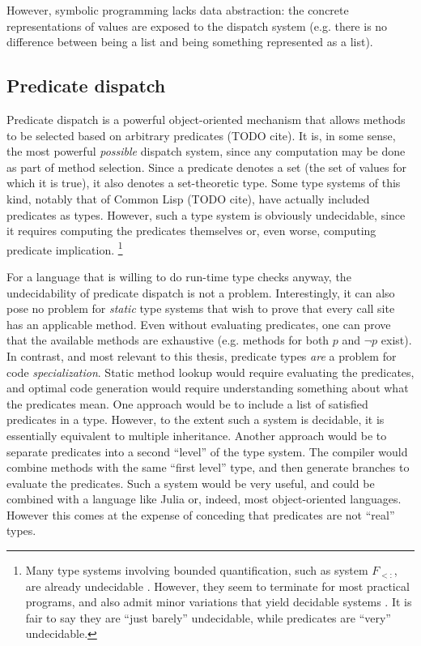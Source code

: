 However, symbolic programming lacks data abstraction: the concrete
representations of values are exposed to the dispatch system
(e.g. there is no difference between being a list and being something
represented as a list).

\subsection{Predicate dispatch}


Predicate dispatch is a powerful object-oriented mechanism that allows
methods to be selected based on arbitrary predicates (TODO cite).
It is, in some
sense, the most powerful \emph{possible} dispatch system, since any
computation may be done as part of method selection. Since a predicate
denotes a set (the set of values for which it is true), it also denotes
a set-theoretic type. Some type systems of this kind, notably that of
Common Lisp (TODO cite), have actually included predicates as types.
However, such a type system is obviously undecidable, since it
requires computing the predicates themselves or, even worse, computing
predicate implication.
\footnote{
Many type systems involving bounded quantification, such as system $F_{<:}$,
are already undecidable \cite{Pierce1994131}.
However, they seem to terminate for most practical programs, and also admit
minor variations that yield decidable systems \cite{Castagna:1994:DBQ:174675.177844}.
It is fair to say they are ``just barely'' undecidable, while predicates
are ``very'' undecidable.
}

For a language that is willing to do run-time type checks anyway, the
undecidability of predicate dispatch is not a problem.
Interestingly, it can also pose no problem for \emph{static} type systems
that wish to prove that every call site has an applicable method.
Even without evaluating predicates, one can prove that the available methods
are exhaustive (e.g. methods for both $p$ and $\neg p$ exist).
In contrast, and most relevant to this thesis, predicate types \emph{are} a
problem for code \emph{specialization}. Static method lookup would require
evaluating the predicates, and optimal code generation would require
understanding something about what the predicates mean. One approach would
be to include a list of satisfied predicates in a type. However, to the
extent such a system is decidable, it is essentially equivalent to multiple
inheritance. Another approach would be to separate predicates into a
second ``level'' of the type system. The compiler would combine methods
with the same ``first level'' type, and then generate branches to evaluate
the predicates. Such a system would be very useful, and could be
combined with a language like Julia or, indeed, most object-oriented
languages. However this comes at the expense of conceding that predicates
are not ``real'' types.

